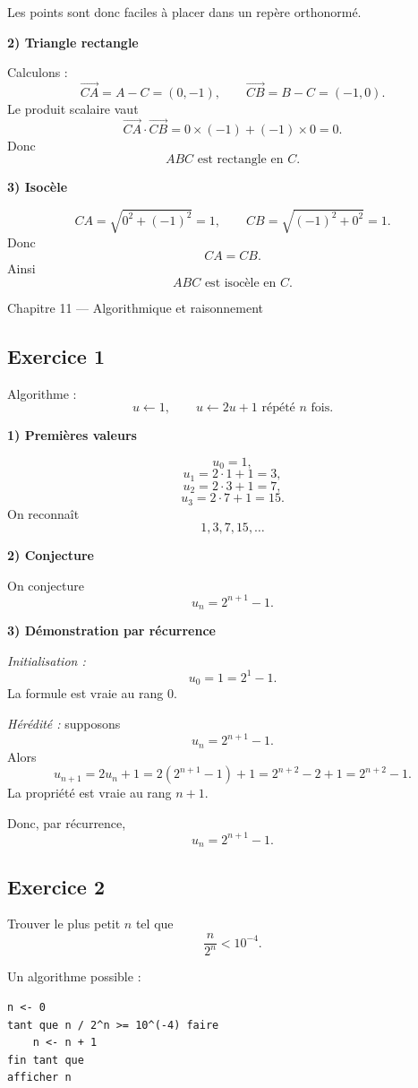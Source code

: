 \documentclass[11pt,a4paper]{article}
\begin{document}
Les points sont donc faciles à placer dans un repère orthonormé.

\textbf{2) Triangle rectangle}

Calculons :
\[
\overrightarrow{CA}=A-C=(0,-1),\qquad \overrightarrow{CB}=B-C=(-1,0).
\]
Le produit scalaire vaut
\[
\overrightarrow{CA}\cdot \overrightarrow{CB}=0\times (-1)+(-1)\times 0=0.
\]
Donc
\[
\boxed{ABC \text{ est rectangle en } C.}
\]

\textbf{3) Isocèle}

\[
CA=\sqrt{0^2+(-1)^2}=1,\qquad CB=\sqrt{(-1)^2+0^2}=1.
\]
Donc
\[
CA=CB.
\]
Ainsi
\[
\boxed{ABC \text{ est isocèle en } C.}
\]

\begin{chapitrebox}{Chapitre 11 --- Algorithmique et raisonnement}
\end{chapitrebox}

\subsection*{Exercice 1}
Algorithme :
\[
u\leftarrow 1,\qquad u\leftarrow 2u+1 \text{ répété } n \text{ fois.}
\]

\textbf{1) Premières valeurs}

\[
u_0=1,
\]
\[
u_1=2\cdot 1+1=3,
\]
\[
u_2=2\cdot 3+1=7,
\]
\[
u_3=2\cdot 7+1=15.
\]
On reconnaît
\[
1,3,7,15,\dots
\]

\textbf{2) Conjecture}

On conjecture
\[
u_n=2^{n+1}-1.
\]

\textbf{3) Démonstration par récurrence}

\emph{Initialisation :}
\[
u_0=1=2^{1}-1.
\]
La formule est vraie au rang \(0\).

\emph{Hérédité :} supposons
\[
u_n=2^{n+1}-1.
\]
Alors
\[
u_{n+1}=2u_n+1=2(2^{n+1}-1)+1=2^{n+2}-2+1=2^{n+2}-1.
\]
La propriété est vraie au rang \(n+1\).

Donc, par récurrence,
\[
\boxed{u_n=2^{n+1}-1.}
\]

\subsection*{Exercice 2}
Trouver le plus petit \(n\) tel que
\[
\frac{n}{2^n}<10^{-4}.
\]

Un algorithme possible :

\begin{verbatim}
n <- 0
tant que n / 2^n >= 10^(-4) faire
    n <- n + 1
fin tant que
afficher n
\end{verbatim}
\end{document}
